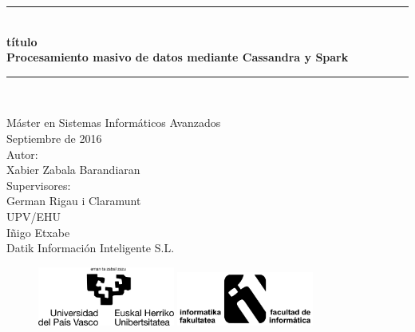\pagestyle{empty}

\newcommand{\HRule}{\rule{\linewidth}{0.5mm}} 

\begin{center}
	\HRule \\[0.5cm]
	\vspace{0.5cm}
	\textbf {
		{\huge título}\\
		\vspace{0.3 cm}
		Procesamiento masivo de datos mediante Cassandra y Spark\\
	}
	\vspace{0.5cm}
	\HRule \\[0.5cm]
	{\large
		
		\vspace{1 cm}
		Máster en Sistemas Informáticos Avanzados\\
		Septiembre de 2016\\
		\vspace{3.0 cm}
		Autor:\\
		\vspace{0.2 cm}
		Xabier Zabala Barandiaran\\
		\vspace{1.0 cm}
		Supervisores:\\
		\vspace{0.2 cm}
		German Rigau i Claramunt\\
		{\small UPV/EHU\\}
		Iñigo Etxabe\\
		{\small Datik Información Inteligente S.L.\\}
	}

	\vspace{2.0 cm} 
	\begin{figure}[h!]
		\centering
		\includegraphics[width=0.4\textwidth]{Ilustraciones/ehu.png}\hfill
		\includegraphics[width=0.4\textwidth]{Ilustraciones/informatica.png}\hfill

	\end{figure}
\end{center}